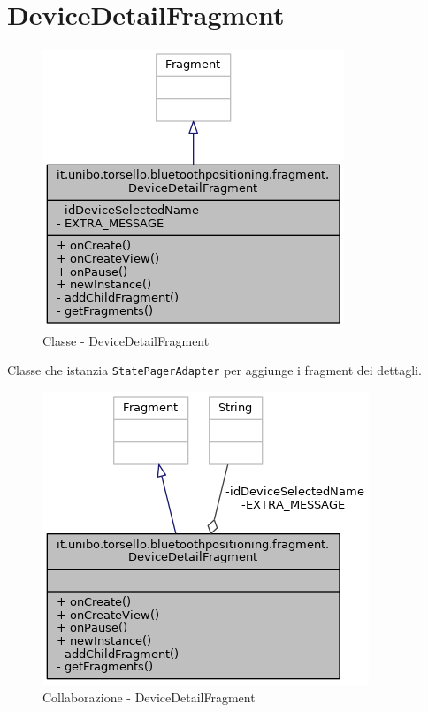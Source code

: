 \section{DeviceDetailFragment}
\begin{figure}[ph]
	\centering
	\includegraphics[width=0.5\linewidth]{img/uml/class/classit_1_1unibo_1_1torsello_1_1bluetoothpositioning_1_1fragment_1_1DeviceDetailFragment__inherit__graph.png}
	\caption{Classe - DeviceDetailFragment}
\end{figure}

Classe che istanzia \texttt{StatePagerAdapter} per aggiunge i fragment dei dettagli.

\begin{figure}[ph]
	\centering
	\includegraphics[width=0.7\linewidth]{img/uml/class/classit_1_1unibo_1_1torsello_1_1bluetoothpositioning_1_1fragment_1_1DeviceDetailFragment__coll__graph.png}
	\caption{Collaborazione - DeviceDetailFragment}
\end{figure}

\newpage
